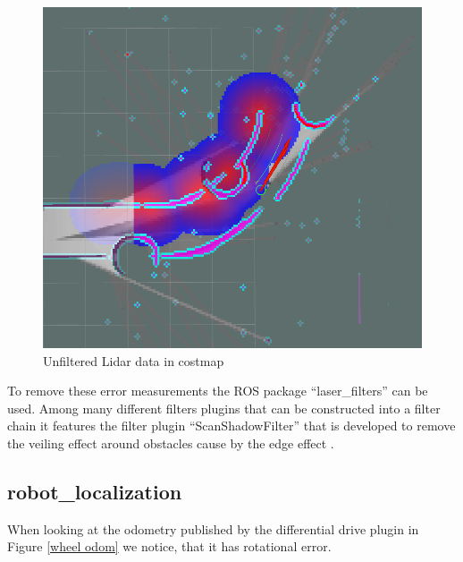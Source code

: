 \begin{figure}
	\includegraphics[width=\textwidth]{Pictures/Needs filtering of Laser}
	\caption{Unfiltered Lidar data in costmap}
	\label{unfiltered lidar}
\end{figure}

To remove these error measurements the ROS package ``laser\_filters'' can be used. Among many different filters plugins that can be constructed into a filter chain it features the filter plugin ``ScanShadowFilter'' that is developed to remove the veiling effect around obstacles cause by the edge effect \cite{laserfilters}.

\subsection{robot\_localization}

When looking at the odometry published by the differential drive plugin in Figure \ref{wheel odom} we notice, that it has rotational error.\\

